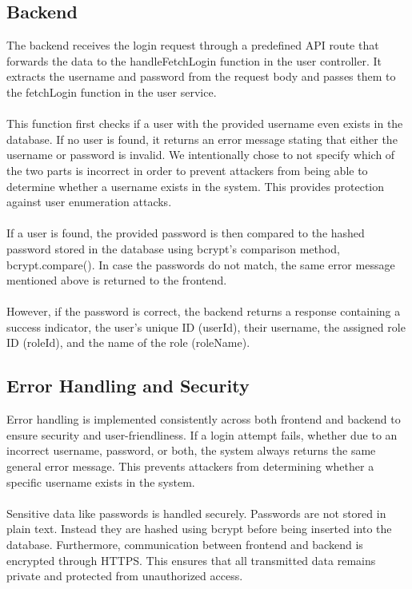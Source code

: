 \documentclass[a4paper,12pt]{report}
\begin{document}
\subsection{Backend}
The backend receives the login request through a predefined API route that forwards the data to the handleFetchLogin function in the user controller. It extracts the username and password from the request body and passes them to the fetchLogin function in the user service.\\\\
This function first checks if a user with the provided username even exists in the database. If no user is found, it returns an error message stating that either the username or password is invalid. We intentionally chose to not specify which of the two parts is incorrect in order to prevent attackers from being able to determine whether a username exists in the system. This provides protection against user enumeration attacks.\\\\
If a user is found, the provided password is then compared to the hashed password stored in the database using bcrypt's comparison method, bcrypt.compare(). In case the passwords do not match, the same error message mentioned above is returned to the frontend.\\\\
However, if the password is correct, the backend returns a response containing a success indicator, the user's unique ID (userId), their username, the assigned role ID (roleId), and the name of the role (roleName).
\subsection{Error Handling and Security}
Error handling is implemented consistently across both frontend and backend to ensure security and user-friendliness. If a login attempt fails, whether due to an incorrect username, password, or both, the system always returns the same general error message. This prevents attackers from determining whether a specific username exists in the system.\\\\
Sensitive data like passwords is handled securely. Passwords are not stored in plain text. Instead they are hashed using bcrypt before being inserted into the database. Furthermore, communication between frontend and backend is encrypted through HTTPS. This ensures that all transmitted data remains private and protected from unauthorized access.
\end{document}

